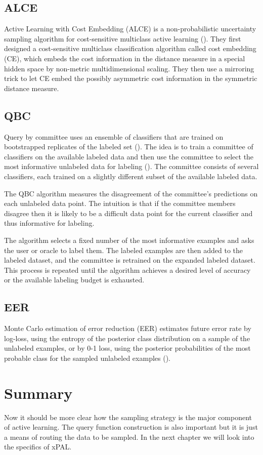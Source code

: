 \subsection{ALCE}
Active Learning with Cost Embedding (ALCE) is a non-probabilistic uncertainty sampling algorithm for cost-sensitive multiclass active learning (\cite{huang2016alce}). They first designed a cost-sensitive multiclass classification algorithm called cost embedding (CE), which embeds the cost information in the distance measure in a special hidden space by non-metric multidimensional scaling. They then use a mirroring trick to let CE embed the possibly asymmetric cost information in the symmetric distance measure.

\subsection{QBC}
Query by committee uses an ensemble of classifiers that are trained on bootstrapped replicates of the labeled set (\cite{seung1992qbc}). The idea is to train a committee of classifiers on the available labeled data and then use the committee to select the most informative unlabeled data for labeling (\cite{freund1997qbc}). The committee consists of several classifiers, each trained on a slightly different subset of the available labeled data.

The QBC algorithm measures the disagreement of the committee's predictions on each unlabeled data point. The intuition is that if the committee members disagree then it is likely to be a difficult data point for the current classifier and thus informative for labeling.

The algorithm selects a fixed number of the most informative examples and asks the user or oracle to label them. The labeled examples are then added to the labeled dataset, and the committee is retrained on the expanded labeled dataset. This process is repeated until the algorithm achieves a desired level of accuracy or the available labeling budget is exhausted.

\subsection{EER}
Monte Carlo estimation of error reduction (EER) estimates future error rate by log-loss, using the entropy of the posterior class distribution on a sample of the unlabeled examples, or by 0-1 loss, using the posterior probabilities of the most probable class for the sampled unlabeled examples (\cite{roy2001eer}).

\section{Summary}
Now it should be more clear how the sampling strategy is the major component of active learning. The query function construction is also important but it is just a means of routing the data to be sampled. In the next chapter we will look into the specifics of xPAL.
